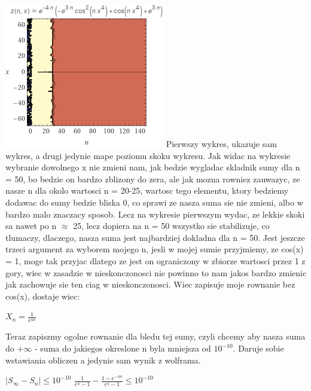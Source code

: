 \documentclass[a4paper,8pt]{article}
\begin{document}
\newline
\includegraphics{mapa}
\newline
Pierwszy wykres, ukazuje sam wykres, a drugi jedynie mape poziomu skoku wykresu. Jak widac na wykresie wybranie dowolnego x nie zmieni nam, jak bedzie wygladac skladnik sumy dla n = 50, bo bedzie on bardzo zblizony do zera, ale jak mozna rowniez zauwazyc, ze nasze n dla okolo wartosci n = 20-25, wartosc tego elementu, ktory bedziemy dodawac do sumy bedzie bliska 0, co sprawi ze nasza suma sie nie zmieni, albo w bardzo malo znaczacy sposob. Lecz na wykresie pierwszym wydac, ze lekkie skoki sa nawet po n $\approx$ 25, lecz dopiera na n = 50 wszystko sie stabilizuje, co tlumaczy, dlaczego, nasza suma jest najbardziej dokladna dla n = 50.
\newline
Jest jeszcze trzeci argument za wyborem mojego n, jesli w mojej sumie przyjmiemy, ze cos(x) = 1, moge tak przyjac dlatego ze jest on ograniczony w zbiorze wartosci przez 1 z gory, wiec w zasadzie w nieskonczonosci nie powinno to nam jakos bardzo zmienic jak zachowuje sie ten ciag w nieskonczonosci. Wiec zapisuje moje rownanie bez cos(x), dostaje wiec:
\newline
\newline
\begin{center}
  $X_{n} = \frac{1}{e^{4n}}$
\end{center}
Teraz zapiszmy ogolne rownanie dla bledu tej sumy, czyli chcemy aby nasza suma do $+\infty$ - suma do jakiegos okreslone n byla mniejsza od $10^{-10}$. Daruje sobie wstawiania obliczen a jedynie sam wynik z wolframa.
\begin{center}
  $\mid S_{\infty} - S_{n}| \leq 10^{-10}$
  \newline
  \newline
  $\frac{1}{e^{4}-1}-\frac{1-e^{-4n}}{e^4-1} \leq 10^{-10}$
\end{center}
\end{document}
